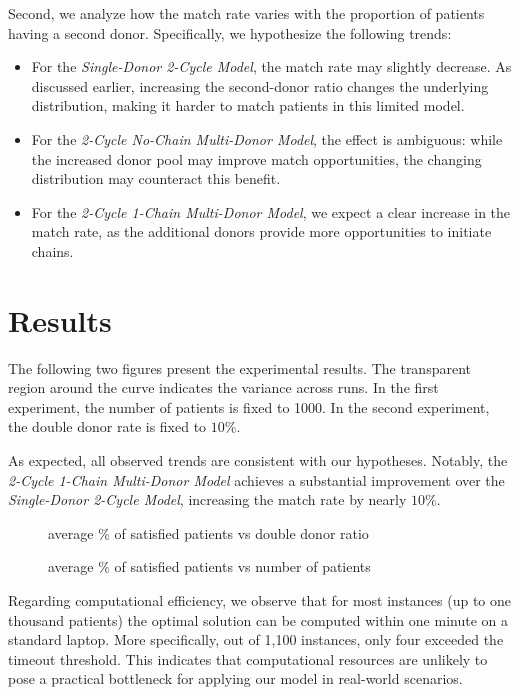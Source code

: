 Second, we analyze how the match rate varies with the proportion of patients having a second donor. Specifically, we hypothesize the following trends:
\begin{itemize}
\item For the \textit{Single-Donor 2-Cycle Model}, the match rate may slightly decrease. As discussed earlier, increasing the second-donor ratio changes the underlying distribution, making it harder to match patients in this limited model.
\item For the \textit{2-Cycle No-Chain Multi-Donor Model}, the effect is ambiguous: while the increased donor pool may improve match opportunities, the changing distribution may counteract this benefit.
\item For the \textit{2-Cycle 1-Chain Multi-Donor Model}, we expect a clear increase in the match rate, as the additional donors provide more opportunities to initiate chains.
\end{itemize}



\section{Results}


The following two figures present the experimental results. The transparent region around the curve indicates the variance across runs. In the first experiment, the number of patients is fixed to 1000. In the second experiment, the double donor rate is fixed to $10\%$.

As expected, all observed trends are consistent with our hypotheses. Notably, the \textit{2-Cycle 1-Chain Multi-Donor Model} achieves a substantial improvement over the \textit{Single-Donor 2-Cycle Model}, increasing the match rate by nearly $10\%$.

\begin{figure}[H]
    \centering
    
    \caption[average \% of satisfied patients vs double donor ratio]{average \% of satisfied patients vs double donor ratio}
    \label{fig:test}
\end{figure}

\begin{figure}[H]
    \centering
    
    \caption[average \% of satisfied patients vs double donor ratio]{average \% of satisfied patients vs number of patients}
    \label{fig:test2}
\end{figure}

Regarding computational efficiency, we observe that for most instances (up to one thousand patients) the optimal solution can be computed within one minute on a standard laptop. More specifically, out of 1,100 instances, only four exceeded the timeout threshold. This indicates that computational resources are unlikely to pose a practical bottleneck for applying our model in real-world scenarios.


